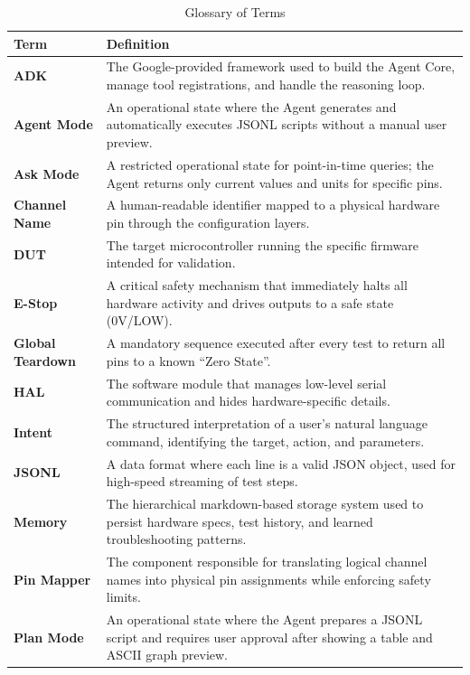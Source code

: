 \documentclass[conference]{IEEEtran}
\begin{document}
\begin{table}[htbp]
\caption{Glossary of Terms}
\begin{center}
\begin{tabular}{|p{2.5cm}|p{5cm}|}
\hline
\textbf{Term} & \textbf{Definition} \\
\hline
\textbf{ADK} & The Google-provided framework used to build the Agent Core, manage tool registrations, and handle the reasoning loop. \\
\hline
\textbf{Agent Mode} & An operational state where the Agent generates and automatically executes JSONL scripts without a manual user preview. \\
\hline
\textbf{Ask Mode} & A restricted operational state for point-in-time queries; the Agent returns only current values and units for specific pins. \\
\hline
\textbf{Channel Name} & A human-readable identifier mapped to a physical hardware pin through the configuration layers. \\
\hline
\textbf{DUT} & The target microcontroller running the specific firmware intended for validation. \\
\hline
\textbf{E-Stop} & A critical safety mechanism that immediately halts all hardware activity and drives outputs to a safe state (0V/LOW). \\
\hline
\textbf{Global Teardown} & A mandatory sequence executed after every test to return all pins to a known ``Zero State''. \\
\hline
\textbf{HAL} & The software module that manages low-level serial communication and hides hardware-specific details. \\
\hline
\textbf{Intent} & The structured interpretation of a user's natural language command, identifying the target, action, and parameters. \\
\hline
\textbf{JSONL} & A data format where each line is a valid JSON object, used for high-speed streaming of test steps. \\
\hline
\textbf{Memory} & The hierarchical markdown-based storage system used to persist hardware specs, test history, and learned troubleshooting patterns. \\
\hline
\textbf{Pin Mapper} & The component responsible for translating logical channel names into physical pin assignments while enforcing safety limits. \\
\hline
\textbf{Plan Mode} & An operational state where the Agent prepares a JSONL script and requires user approval after showing a table and ASCII graph preview. \\

\end{tabular}
\end{center}
\end{table}
\end{document}
